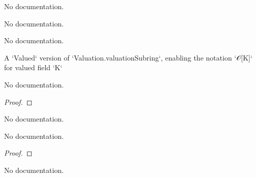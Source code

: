 \begin{theorem}\label{Valued.le_one_iff_val_le_one}
                No documentation.
    \end{theorem}

\begin{theorem}\label{Valued.lt_one_iff_val_lt_one}
                No documentation.
    \end{theorem}

\begin{theorem}\label{Valued.zero_le}
                No documentation.
    \end{theorem}

\begin{definition}\label{Valued.valuationSubring}
        \leanok
                A `Valued` version of `Valuation.valuationSubring`, enabling the notation `𝒪[K]` for valued field `K`
    \end{definition}

\begin{theorem}\label{Valued.integer_valuation_eq}
        \leanok
                No documentation.
    \end{theorem}

\begin{proof}
    \leanok
\end{proof}

\begin{theorem}\label{Valued.integerAlgebraMap.monotone}
                No documentation.
    \end{theorem}

\begin{theorem}\label{Valued.integer_val_coe}
        \leanok
                No documentation.
    \end{theorem}

\begin{proof}
    \leanok
\end{proof}

\begin{theorem}\label{Valued.valuationSubring_val_coe}
        \leanok
                No documentation.
    \end{theorem}

